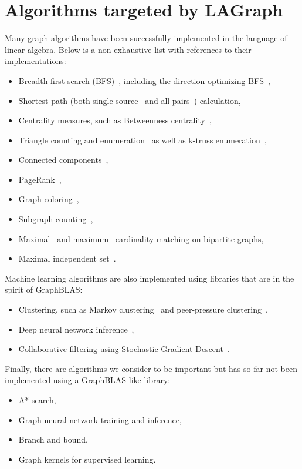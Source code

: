 \section{Algorithms targeted by LAGraph}
\label{sec:algorithms}

Many graph algorithms have been successfully implemented in the language of linear algebra. Below is a non-exhaustive list with references to their implementations:

\begin{itemize}
\item Breadth-first search (BFS)~\cite{bulucc2011parallel, gbtl-cuda16, Davis19}, including the direction optimizing BFS~\cite{Yang:2018:IPE},
\item Shortest-path (both single-source~\cite{Yang:2019:GBL, ssspgrapl19, gbtl-cuda16} and all-pairs~\cite{ca_apsp}) calculation,
\item Centrality measures, such as Betweenness centrality~\cite{combblas},
\item Triangle counting and enumeration~\cite{trianglegabb15, wang2016comparative} as well as k-truss enumeration~\cite{davis2018graph},
\item Connected components~\cite{lacc2019},
\item PageRank~\cite{satish2014navigating},
\item Graph coloring~\cite{coloringgrapl19},
\item Subgraph counting~\cite{chen2019graphblas},
\item Maximal~\cite{parco16} and maximum~\cite{matchingipdps16} cardinality matching on bipartite graphs,
\item Maximal independent set~\cite{jpdc15, Yang:2019:GBL}.
\end{itemize}

Machine learning algorithms are also implemented using libraries that are in the spirit of GraphBLAS:
\begin{itemize}
\item Clustering, such as Markov clustering~\cite{azad2018hipmcl} and peer-pressure clustering~\cite{gilbert2006high},
\item Deep neural network inference~\cite{kepner2017enabling},
\item Collaborative filtering using Stochastic Gradient Descent~\cite{satish2014navigating}.
\end{itemize}

Finally, there are algorithms we consider to be important but has so far not been implemented using a GraphBLAS-like library:
\begin{itemize}
\item A* search,
\item Graph neural network training and inference,
\item Branch and bound,
\item Graph kernels for supervised learning.
\end{itemize}
